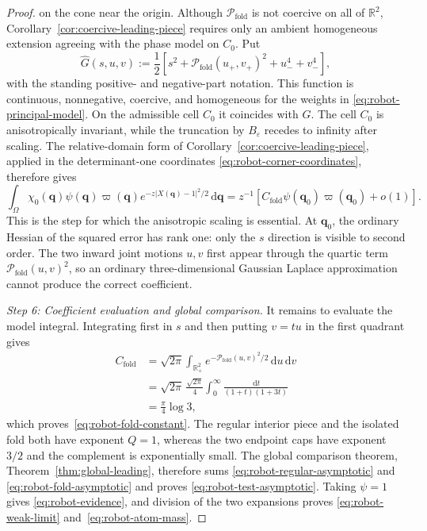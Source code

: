 \documentclass[10pt,a4paper]{amsart}
\newcommand{\R}{\mathbb{R}}
\newcommand{\dd}{\,\mathrm{d}}
\newcommand{\eps}{\varepsilon}
\begin{document}
\begin{proof}
on the cone near the origin.  Although $\mathcal P_{\mathrm{fold}}$ is not coercive on all of $\R^2$,
Corollary~\ref{cor:coercive-leading-piece} requires only an ambient homogeneous
extension agreeing with the phase model on $C_0$.  Put
\begin{equation}\label{eq:robot-extended-model}
 \widehat G(s,u,v):=
 \frac12\left[
 s^2+\mathcal P_{\mathrm{fold}}(u_+,v_+)^2+u_-^4+v_-^4
 \right],
\end{equation}
with the standing positive- and negative-part notation.  This function is continuous,
nonnegative, coercive, and homogeneous for the weights in
\eqref{eq:robot-principal-model}.  On the admissible cell $C_0$ it coincides
with $G$.  The cell $C_0$ is anisotropically invariant, while the truncation by
$B_\eps$ recedes to infinity after scaling.  The relative-domain form of
Corollary~\ref{cor:coercive-leading-piece}, applied in the determinant-one
coordinates
\eqref{eq:robot-corner-coordinates}, therefore gives
\begin{equation}\label{eq:robot-fold-asymptotic}
 \int_\Omega\chi_0(\bm q)\psi(\bm q)\varpi(\bm q)
 e^{-z|X(\bm q)-1|^2/2}\dd \bm q
 =z^{-1}\left[
 C_{\mathrm{fold}}\psi(\bm q_0)\varpi(\bm q_0)+o(1)
 \right].
\end{equation}
This is the step for which the anisotropic scaling is essential.  At
$\bm q_0$, the ordinary Hessian of the squared error has rank one: only the $s$
direction is visible to second order.  The two inward joint motions $u,v$
first appear through the quartic term $\mathcal P_{\mathrm{fold}}(u,v)^2$, so an ordinary
three-dimensional Gaussian Laplace approximation cannot produce the correct
coefficient.

\smallskip
\noindent\emph{Step 6: Coefficient evaluation and global comparison.}
It remains to evaluate the model integral.  Integrating first in $s$ and then
putting $v=tu$ in the first quadrant gives
\begin{align*}
 C_{\mathrm{fold}}
 &=\sqrt{2\pi}\int_{\R_+^2}
 e^{-\mathcal P_{\mathrm{fold}}(u,v)^2/2}\dd u\dd v\\
 &=\sqrt{2\pi}\,\frac{\sqrt{2\pi}}4
 \int_0^\infty\frac{\dd t}{(1+t)(1+3t)}\\
 &=\frac{\pi}{4}\log3,
\end{align*}
which proves~\eqref{eq:robot-fold-constant}.  The regular interior piece
and the isolated fold both have exponent $Q=1$, whereas the two endpoint caps
have exponent $3/2$ and the complement is exponentially small.  The global
comparison theorem, Theorem~\ref{thm:global-leading}, therefore sums
\eqref{eq:robot-regular-asymptotic} and
\eqref{eq:robot-fold-asymptotic} and proves
\eqref{eq:robot-test-asymptotic}.  Taking $\psi=1$ gives
\eqref{eq:robot-evidence}, and division of the two expansions proves
\eqref{eq:robot-weak-limit} and~\eqref{eq:robot-atom-mass}.


\end{proof}
\end{document}
